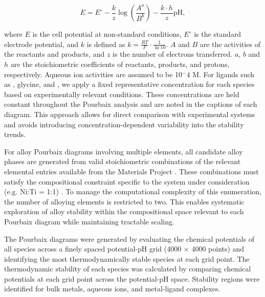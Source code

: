 \documentclass[journal=jacsat,manuscript=article]{achemso}
\begin{document}
\begin{equation} \label{eq:nernst} E = E^\circ - \frac{k}{z} \log \left(\frac{A^a}{B^b}\right) - \frac{k \cdot h}{z} \text{pH}, \end{equation}

where \(E\) is the cell potential at non-standard conditions, \(E^\circ\) is the standard electrode potential, and $k$ is defined as \(k = \frac{RT}{F} \cdot \frac{1}{\ln 10}\). \(A\) and \(B\) are the activities of the reactants and products, and \(z\) is the number of electrons transferred. \(a\), \(b\) and \(h\) are the stoichiometric coefficients of reactants, products, and protons, respectively. Aqueous ion activities are assumed to be 10$^-4$ M. For ligands such as , glycine, and , we apply a fixed representative concentration for each species based on experimentally relevant conditions. These concentrations are held constant throughout the Pourbaix analysis and are noted in the captions of each diagram. This approach allows for direct comparison with experimental systems and avoids introducing concentration-dependent variability into the stability trends.

For alloy Pourbaix diagrams involving multiple elements, all candidate alloy phases are generated from valid stoichiometric combinations of the relevant elemental entries available from the Materials Project \cite{Jain2013TheInnovation}. These combinations must satisfy the compositional constraint specific to the system under consideration (e.g. Ni:Ti = 1:1) \cite{Thompson2011PourbaixSystems}. To manage the computational complexity of this enumeration, the number of alloying elements is restricted to two. This enables systematic exploration of alloy stability within the compositional space relevant to each Pourbaix diagram while maintaining tractable scaling. 





The Pourbaix diagrams were generated by evaluating the chemical potentials of all species across a finely spaced potential-pH grid (4000 $\times$ 4000 points) and identifying the most thermodynamically stable species at each grid point. The thermodynamic stability of each species was calculated by comparing chemical potentials at each grid point across the potential-pH space. Stability regions were identified for bulk metals, aqueous ions, and metal-ligand complexes. 
\end{document}
